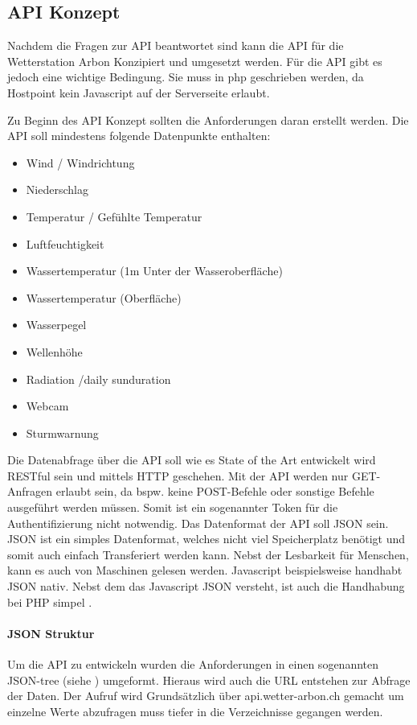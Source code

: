 \subsection{API Konzept}
Nachdem die Fragen zur API beantwortet sind kann die API für die Wetterstation Arbon Konzipiert und umgesetzt werden. Für die API gibt es jedoch eine wichtige Bedingung. Sie muss in php geschrieben werden, da Hostpoint kein Javascript auf der Serverseite erlaubt.

Zu Beginn des API Konzept sollten die Anforderungen daran erstellt werden. Die API soll mindestens folgende Datenpunkte enthalten:
\begin{itemize}
\item Wind / Windrichtung
\item Niederschlag
\item Temperatur / Gefühlte Temperatur
\item Luftfeuchtigkeit
\item Wassertemperatur (1m Unter der Wasseroberfläche)
\item Wassertemperatur (Oberfläche)
\item Wasserpegel
\item Wellenhöhe
\item Radiation /daily sunduration
\item Webcam
\item Sturmwarnung
\end{itemize}
Die Datenabfrage über die API soll wie es State of the Art entwickelt wird RESTful sein und mittels HTTP geschehen. Mit der API werden nur GET-Anfragen erlaubt sein, da bspw. keine POST-Befehle oder sonstige Befehle ausgeführt werden müssen. Somit ist ein sogenannter Token für die Authentifizierung nicht notwendig. Das Datenformat der API soll JSON sein. JSON ist ein simples Datenformat, welches nicht viel Speicherplatz benötigt und somit auch einfach Transferiert werden kann. Nebst der Lesbarkeit für Menschen, kann es auch von Maschinen gelesen werden. Javascript beispielsweise handhabt JSON nativ. Nebst dem das Javascript JSON versteht, ist auch die Handhabung bei PHP simpel  . 

\paragraph{JSON Struktur}

Um die API zu entwickeln wurden die Anforderungen in einen sogenannten JSON-tree (siehe ) umgeformt. Hieraus wird auch die URL entstehen zur Abfrage der Daten. Der Aufruf wird Grundsätzlich über api.wetter-arbon.ch gemacht um einzelne Werte abzufragen muss tiefer in die Verzeichnisse gegangen werden.


